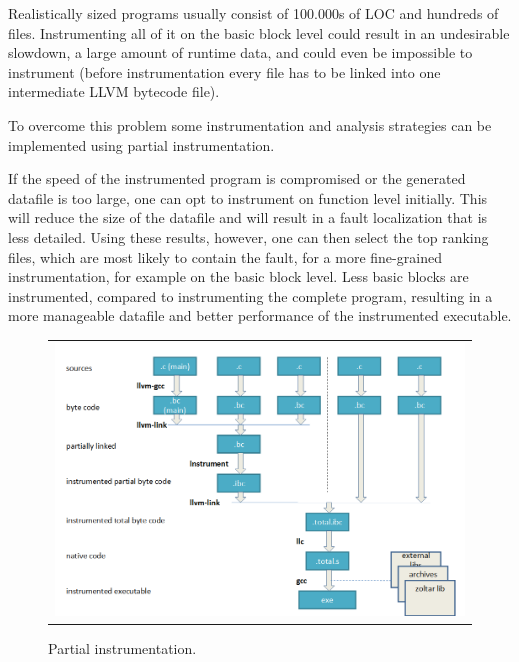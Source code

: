 
Realistically sized programs usually consist
of 100.000s of LOC and hundreds of files.
Instrumenting all of it on the basic block level
could result in an undesirable slowdown,
a large amount of runtime data,
and could even be impossible to instrument
(before instrumentation every file has to be
linked into one intermediate LLVM bytecode file).

To overcome this problem some instrumentation
and analysis strategies can be implemented
using partial instrumentation.

If the speed of the instrumented program is
compromised or the generated datafile is too
large, one can opt to instrument on function
level initially.
This will reduce the size of the datafile
and will result in a fault localization that
is less detailed.
Using these results, however, one can then
select the top ranking files, which are most
likely to contain the fault, for a more
fine-grained instrumentation, for example
on the basic block level.
Less basic blocks are instrumented,
compared to instrumenting the complete program,
resulting in a more manageable datafile and better
performance of the instrumented executable.

	\begin{figure}[h!]
		\begin{center}
		\begin{tabular}{c}
			\includegraphics[scale=0.30]{sources/partial_instrumentation.png} \\
		\end{tabular}
		\end{center}
		\caption{Partial instrumentation.}
		\label{fig:partialInstrumentation}
	\end{figure}

